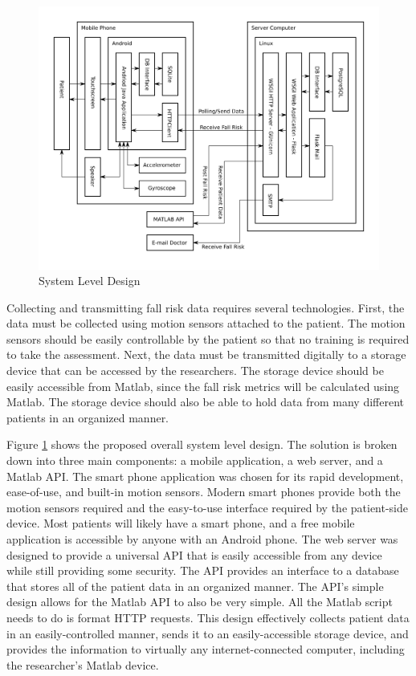 \documentclass[conference]{IEEEtran}
\begin{document}
\begin{figure}[!htb]
\centering
\includegraphics[scale=0.3]{img/systemdesign.png}
\caption{System Level Design}
\label{systemleveldesign}
\end{figure}

Collecting and transmitting fall risk data requires several technologies. First, the data must be collected using motion sensors attached to the patient. The motion sensors should be easily controllable by the patient so that no training is required to take the assessment. Next, the data must be transmitted digitally to a storage device that can be accessed by the researchers. The storage device should be easily accessible from Matlab, since the fall risk metrics will be calculated using Matlab. The storage device should also be able to hold data from many different patients in an organized manner.

Figure \ref{systemleveldesign} shows the proposed overall system level design. The solution is broken down into three main components: a mobile application, a web server, and a Matlab API. The smart phone application was chosen for its rapid development, ease-of-use, and built-in motion sensors. Modern smart phones provide both the motion sensors required and the easy-to-use interface required by the patient-side device. Most patients will likely have a smart phone, and a free mobile application is accessible by anyone with an Android phone. The web server was designed to provide a universal API that is easily accessible from any device while still providing some security. The API provides an interface to a database that stores all of the patient data in an organized manner. The API's simple design allows for the Matlab API to also be very simple. All the Matlab script needs to do is format HTTP requests. This design effectively collects patient data in an easily-controlled manner, sends it to an easily-accessible storage device, and provides the information to virtually any internet-connected computer, including the researcher's Matlab device.
\end{document}
